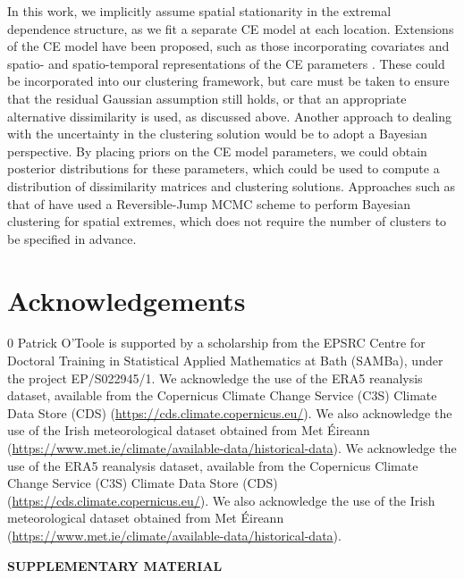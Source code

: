 \documentclass[12pt,compact]{article}
\newcommand{\blind}{0}
\begin{document}
In this work, we implicitly assume spatial stationarity in the extremal dependence structure, as we fit a separate CE model at each location.
Extensions of the CE model have been proposed, such as those incorporating covariates \citep{Richards2023} and spatio- and spatio-temporal representations of the CE parameters \citep{Simpson2021, Wadsworth2022}.
These could be incorporated into our clustering framework, but care must be taken to ensure that the residual Gaussian assumption still holds, or that an appropriate alternative dissimilarity is used, as discussed above.
Another approach to dealing with the uncertainty in the clustering solution would be to adopt a Bayesian perspective.
By placing priors on the CE model parameters, we could obtain posterior distributions for these parameters, which could be used to compute a distribution of dissimilarity matrices and clustering solutions.
Approaches such as that of \citet{Rohrbeck2021} have used a Reversible-Jump MCMC scheme to perform Bayesian clustering for spatial extremes, which does not require the number of clusters to be specified in advance.



\section*{Acknowledgements}

\blind
{%
Patrick O'Toole is supported by a scholarship from the EPSRC Centre for Doctoral Training in Statistical Applied Mathematics at Bath (SAMBa), under the project EP/S022945/1.
We acknowledge the use of the ERA5 reanalysis dataset, available from the Copernicus Climate Change Service (C3S) Climate Data Store (CDS) (\url{https://cds.climate.copernicus.eu/}). 
We also acknowledge the use of the Irish meteorological dataset obtained from Met Éireann (\url{https://www.met.ie/climate/available-data/historical-data}).
} 
\else
{%
We acknowledge the use of the ERA5 reanalysis dataset, available from the Copernicus Climate Change Service (C3S) Climate Data Store (CDS) (\url{https://cds.climate.copernicus.eu/}). 
We also acknowledge the use of the Irish meteorological dataset obtained from Met Éireann (\url{https://www.met.ie/climate/available-data/historical-data}).
}
\fi


\begin{center}
{\large\bf SUPPLEMENTARY MATERIAL}
\end{center}
\end{document}
